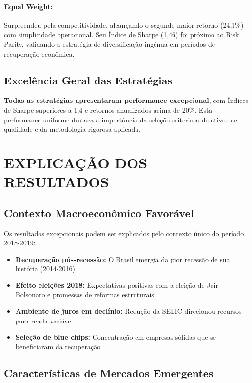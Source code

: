 \paragraph{Equal Weight:} Surpreendeu pela competitividade, alcançando o segundo maior retorno (24,1\%) com simplicidade operacional. Seu Índice de Sharpe (1,46) foi próximo ao Risk Parity, validando a estratégia de diversificação ingênua em períodos de recuperação econômica.

\subsection{Excelência Geral das Estratégias}

\textbf{Todas as estratégias apresentaram performance excepcional}, com Índices de Sharpe superiores a 1,4 e retornos anualizados acima de 20\%. Esta performance uniforme destaca a importância da seleção criteriosa de ativos de qualidade e da metodologia rigorosa aplicada.

\section{EXPLICAÇÃO DOS RESULTADOS}

\subsection{Contexto Macroeconômico Favorável}

Os resultados excepcionais podem ser explicados pelo contexto único do período 2018-2019:

\begin{itemize}
    \item \textbf{Recuperação pós-recessão:} O Brasil emergia da pior recessão de sua história (2014-2016)
    \item \textbf{Efeito eleições 2018:} Expectativas positivas com a eleição de Jair Bolsonaro e promessas de reformas estruturais
    \item \textbf{Ambiente de juros em declínio:} Redução da SELIC direcionou recursos para renda variável
    \item \textbf{Seleção de blue chips:} Concentração em empresas sólidas que se beneficiaram da recuperação
\end{itemize}

\subsection{Características de Mercados Emergentes}

